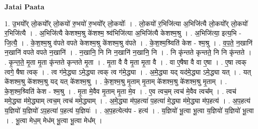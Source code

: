 \documentclass[17pt]{extarticle}
\begin{document}
\textbf{Jatai Paata} \newline

1. उ॒भयो᳚र् लो॒कयो᳚र् लो॒कयो॑ रु॒भयो॑ रु॒भयो᳚र् लो॒कयोः᳚ । . लो॒कयो॑ र॒भिजि॑त्या अ॒भिजि॑त्यै लो॒कयो᳚र् लो॒कयो॑ र॒भिजि॑त्यै । . अ॒भिजि॑त्यै केशश्म॒श्रु के॑शश्म॒ श्र्व॑भिजि॑त्या अ॒भिजि॑त्यै केशश्म॒श्रु । . अ॒भिजि॑त्या॒ इत्य॒भि - जि॒त्यै॒ । . के॒श॒श्म॒श्रु व॑पते वपते केशश्म॒श्रु के॑शश्म॒श्रु व॑पते । . के॒श॒श्म॒श्र्विति॑ केश - श्म॒श्रु । . व॒प॒ते॒ न॒खानि॑ न॒खानि॑ वपते वपते न॒खानि॑ । . न॒खानि॒ नि नि न॒खानि॑ न॒खानि॒ नि । . नि कृ॑न्तते कृन्तते॒ नि नि कृ॑न्तते । . कृ॒न्त॒ते॒ मृ॒ता मृ॒ता कृ॑न्तते कृन्तते मृ॒ता । . मृ॒ता वै वै मृ॒ता मृ॒ता वै । . वा ए॒षैषा वै वा ए॒षा । . ए॒षा त्वक् त्वगे॒ षैषा त्वक् । . त्व ग॑मे॒द्ध्या ऽमे॒द्ध्या त्वक् त्व ग॑मे॒द्ध्या । . अ॒मे॒द्ध्या यद् यद॑मे॒द्ध्या ऽमे॒द्ध्या यत् । . यत् के॑शश्म॒श्रु के॑शश्म॒श्रु यद् यत् के॑शश्म॒श्रु । . के॒श॒श्म॒श्रु मृ॒ताम् मृ॒ताम् के॑शश्म॒श्रु के॑शश्म॒श्रु मृ॒ताम् । . के॒श॒श्म॒श्र्विति॑ केश - श्म॒श्रु । . मृ॒ता मे॒वैव मृ॒ताम् मृ॒ता मे॒व । . ए॒व त्वच॒म् त्वच॑ मे॒वैव त्वच᳚म् । . त्वच॑ ममे॒द्ध्या म॑मे॒द्ध्याम् त्वच॒म् त्वच॑ ममे॒द्ध्याम् । . अ॒मे॒द्ध्या म॑प॒हत्या॑ प॒हत्या॑ मे॒द्ध्या म॑मे॒द्ध्या म॑प॒हत्य॑ । . अ॒प॒हत्य॑ य॒ज्ञियो॑ य॒ज्ञियो॑ ऽप॒हत्या॑ प॒हत्य॑ य॒ज्ञियः॑ । . अ॒प॒हत्येत्य॑प - हत्य॑ । . य॒ज्ञियो॑ भू॒त्वा भू॒त्वा य॒ज्ञियो॑ य॒ज्ञियो॑ भू॒त्वा । . भू॒त्वा मेध॒म् मेध॑म् भू॒त्वा भू॒त्वा मेध᳚म् । \newline
\end{document}
